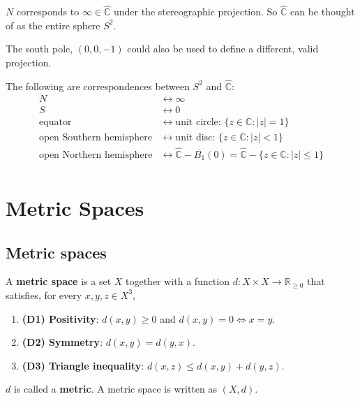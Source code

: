 \begin{remark}
	$N$ corresponds to $\infty \in \hat{\mathbb{C}}$ under the stereographic projection. So $\hat{\mathbb{C}}$ can be thought of as the entire sphere $S^2$.
\end{remark}

\begin{remark}
	The south pole, $(0, 0, -1)$ could also be used to define a different, valid projection.
\end{remark}

\begin{proposition}
	The following are correspondences between $S^2$ and $\hat{\mathbb{C}}$:
	\[
		\begin{aligned}
			N & \longleftrightarrow \infty \\
			S & \longleftrightarrow 0 \\
			\text{equator} & \longleftrightarrow \text{unit circle: } \{ z \in \mathbb{C}: |z| = 1 \} \\
			\text{open Southern hemisphere} & \longleftrightarrow \text{unit disc: } \{ z \in \mathbb{C}: |z| < 1 \} \\
			\text{open Northern hemisphere} & \longleftrightarrow \hat{\mathbb{C}} - \overline{B_1}(0) = \hat{\mathbb{C}} - \{ z \in \mathbb{C}: |z| \le 1 \} \\
		\end{aligned}
	\]
\end{proposition}

\section{Metric Spaces}

\subsection{Metric spaces}

\begin{definition}\label{def:metricSpace}
	A \textbf{metric space} is a set $X$ together with a function $d: X \times X \rightarrow \mathbb{R}_{\ge 0}$ that satisfies, for every $x, y, z \in X^3$,
	\begin{enumerate}
		\item \textbf{(D1) Positivity}: $d(x, y) \ge 0$ and $d(x, y) = 0 \Longleftrightarrow x = y$.
		\item \textbf{(D2) Symmetry}: $d(x, y) = d(y, x)$.
		\item \textbf{(D3) Triangle inequality}: $d(x, z) \le d(x, y) + d(y, z)$.
	\end{enumerate}
	$d$ is called a \textbf{metric}. A metric space is written as $(X, d)$.
\end{definition}

